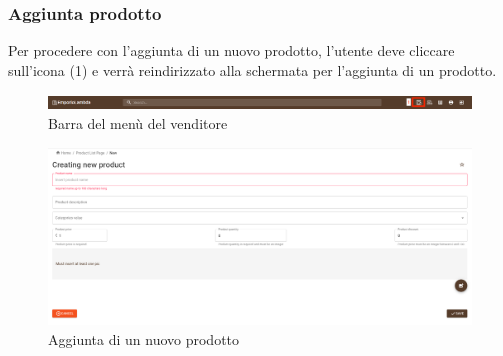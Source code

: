 \subsubsection{Aggiunta prodotto}
Per procedere con l'aggiunta di un nuovo prodotto, l'utente deve cliccare sull'icona (1) e verrà reindirizzato alla schermata per l'aggiunta di un prodotto.
\begin{figure}[H]
	\centering
	\includegraphics[scale=0.4]{Immagini/Venditore/Seller Header.png}
	\caption{Barra del menù del venditore}
	\label{fig:BarraVenditore}
\end{figure}
\begin{figure}[H]
	\centering
	\includegraphics[scale=0.25]{Immagini/Venditore/pdp-new.seller.png}
	\caption{Aggiunta di un nuovo prodotto}
	\label{fig:AggiuntaProdotto}
\end{figure}
